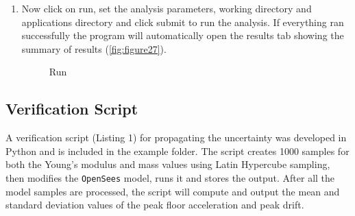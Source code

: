 \begin{enumerate}
\item Now click on run, set the analysis parameters, working directory and applications directory and click submit to run the analysis. 
If everything ran successfully the program will automatically open the results tab showing the summary of results (\autoref{fig:figure27}).
\begin{figure}[!htbp]
  \caption{Run}
  \label{fig:figure27}
\end{figure}

\end{enumerate}

\subsection{Verification Script}
A verification script (Listing 1) for propagating the uncertainty was
developed in Python and is included in the example folder.  The script
creates 1000 samples for both the Young’s modulus and mass values
using Latin Hypercube sampling, then modifies the \texttt{OpenSees} model, runs
it and stores the output.  After all the model samples are processed,
the script will compute and output the mean and standard deviation
values of the peak floor acceleration and peak drift.

